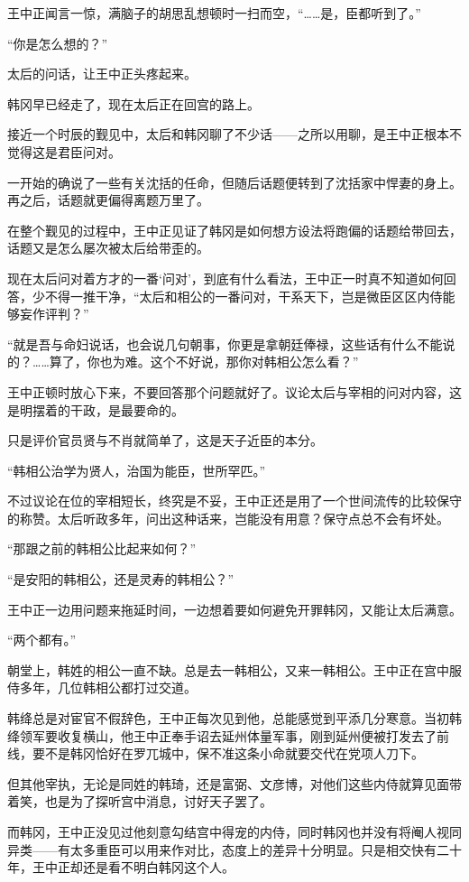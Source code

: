 王中正闻言一惊，满脑子的胡思乱想顿时一扫而空，“……是，臣都听到了。”

“你是怎么想的？”

太后的问话，让王中正头疼起来。

韩冈早已经走了，现在太后正在回宫的路上。

接近一个时辰的觐见中，太后和韩冈聊了不少话——之所以用聊，是王中正根本不觉得这是君臣问对。

一开始的确说了一些有关沈括的任命，但随后话题便转到了沈括家中悍妻的身上。再之后，话题就更偏得离题万里了。

在整个觐见的过程中，王中正见证了韩冈是如何想方设法将跑偏的话题给带回去，话题又是怎么屡次被太后给带歪的。

现在太后问对着方才的一番‘问对’，到底有什么看法，王中正一时真不知道如何回答，少不得一推干净，“太后和相公的一番问对，干系天下，岂是微臣区区内侍能够妄作评判？”

“就是吾与命妇说话，也会说几句朝事，你更是拿朝廷俸禄，这些话有什么不能说的？……算了，你也为难。这个不好说，那你对韩相公怎么看？”

王中正顿时放心下来，不要回答那个问题就好了。议论太后与宰相的问对内容，这是明摆着的干政，是最要命的。

只是评价官员贤与不肖就简单了，这是天子近臣的本分。

“韩相公治学为贤人，治国为能臣，世所罕匹。”

不过议论在位的宰相短长，终究是不妥，王中正还是用了一个世间流传的比较保守的称赞。太后听政多年，问出这种话来，岂能没有用意？保守点总不会有坏处。

“那跟之前的韩相公比起来如何？”

“是安阳的韩相公，还是灵寿的韩相公？”

王中正一边用问题来拖延时间，一边想着要如何避免开罪韩冈，又能让太后满意。

“两个都有。”

朝堂上，韩姓的相公一直不缺。总是去一韩相公，又来一韩相公。王中正在宫中服侍多年，几位韩相公都打过交道。

韩绛总是对宦官不假辞色，王中正每次见到他，总能感觉到平添几分寒意。当初韩绛领军要收复横山，他王中正奉手诏去延州体量军事，刚到延州便被打发去了前线，要不是韩冈恰好在罗兀城中，保不准这条小命就要交代在党项人刀下。

但其他宰执，无论是同姓的韩琦，还是富弼、文彦博，对他们这些内侍就算见面带着笑，也是为了探听宫中消息，讨好天子罢了。

而韩冈，王中正没见过他刻意勾结宫中得宠的内侍，同时韩冈也并没有将阉人视同异类——有太多重臣可以用来作对比，态度上的差异十分明显。只是相交快有二十年，王中正却还是看不明白韩冈这个人。

